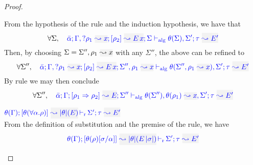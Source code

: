 \begin{proof}
\begin{description}
  From the hypothesis of the rule and the induction hypothesis, we have that
\begin{equation*}
\forall\Sigma,\quad \admres{\bar\alpha}{\tenv,\envi{\rulet_1}{x}}{\rulet_2}{\mmapp{E}{x}}{\Sigma}{\type}{E'}{\theta(\Sigma),\Sigma'}
\end{equation*}
Then, by choosing $\Sigma = \Sigma'',\ie{\rulet_1}{x}$ with any $\Sigma''$, the above can be refined to
\begin{equation*}
\forall \Sigma'',\quad\admres{\bar\alpha}{\tenv,\envi{\rulet_1}{x}}{\rulet_2}{\mmapp{E}{x}}{\Sigma'',\ie{\rulet_1}{x}}{\type}{E'}{\theta(\Sigma'',\ie{\rulet_1}{x}),\Sigma'}
\end{equation*}
  By rule  we may then conclude
\begin{equation*}
\forall\Sigma'',\quad\admres{\bar\alpha}{\tenv}{\rulet_1\To\rulet_2}{E}{\Sigma''}{\type}{E'}{\theta(\Sigma''),\ie{\theta(\rulet_1)}{x},\Sigma'}
\end{equation*}

\item[\fbox{\rref{M-TApp}}]\quad
$\dmres{\theta(\tenv)}{\theta(\tall{\alpha}{\rulet})}{\etrans{\theta}(E)}{\type}{E'}{\Sigma'}$\ \\

From the definition of substitution and the premise of the rule, we have
\begin{equation*}
  \dmres{\theta(\tenv)}{\theta(\rulet)[\suty/\alpha]}{\etrans{\theta}(\mmapp{E}{\etrans{\suty}})}{\type}{E'}{\Sigma'}
\end{equation*}


\end{description}
\end{proof}
